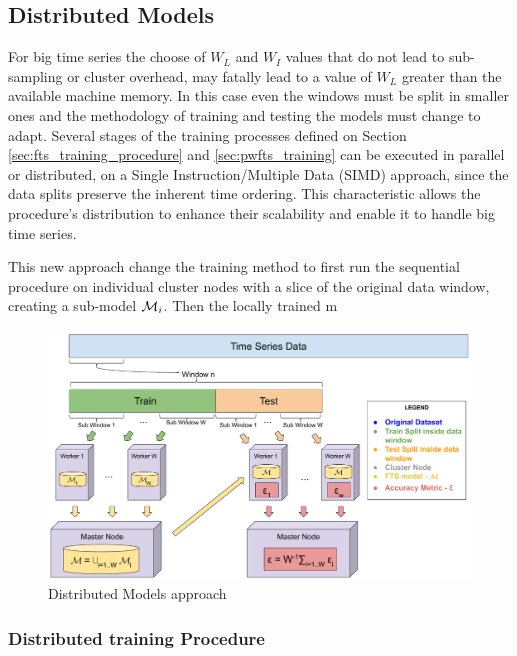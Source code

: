 \subsection{Distributed Models}
\label{sec:distributed_models}

For big time series the choose of $W_L$ and $W_I$ values that do not lead to sub-sampling or cluster overhead, may fatally lead to a value of $W_L$ greater than the available machine memory. In this case even the windows must be split in smaller ones and the methodology of training and testing the models must change to adapt. Several stages of the training processes defined on Section \ref{sec:fts_training_procedure} and  \ref{sec:pwfts_training} can be executed in parallel or distributed, on a Single Instruction/Multiple Data (SIMD) approach, since the data splits preserve the inherent time ordering. This characteristic allows the procedure's distribution to enhance their scalability and enable it to handle big time series.

This new approach change the training method to first run the sequential procedure on individual cluster nodes with a slice of the original data window, creating a sub-model $\mathcal{M}_i$. Then the locally trained m

\begin{figure}[htb]
    \centering
    \includegraphics[width=\textwidth]{figures/distributed_models.pdf}
    \caption{Distributed Models approach}
    \label{fig:distributed_models}
\end{figure}


\subsubsection{Distributed training Procedure}
\label{sec:distributed_training}

